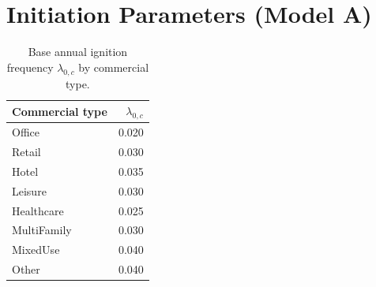 \documentclass[11pt,a4paper]{article}
\begin{document}
\clearpage
\appendix

\section{Initiation Parameters (Model A)}
\label{app:initiation}

\begin{table}[H]
\centering
\caption{Base annual ignition frequency $\lambda_{0,c}$ by commercial type.}
\begin{tabular}{lr}
\toprule
Commercial type & $\lambda_{0,c}$ \\
\midrule
Office       & 0.020 \\
Retail       & 0.030 \\
Hotel        & 0.035 \\
Leisure      & 0.030 \\
Healthcare   & 0.025 \\
MultiFamily  & 0.030 \\
MixedUse     & 0.040 \\
Other        & 0.040 \\
\bottomrule
\end{tabular}
\end{table}
\end{document}
